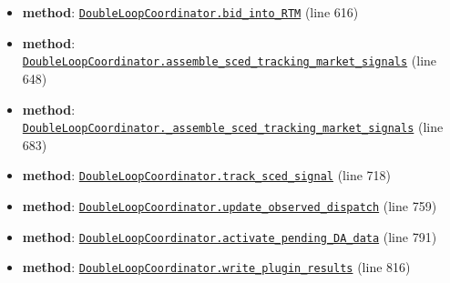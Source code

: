 \documentclass[11pt]{report}
\begin{document}
\begin{itemize}[leftmargin=*]
  \item \textbf{method}: \hyperref[def:coordinator.py:DoubleLoopCoordinator.bid_into_RTM:L616]{\texttt{DoubleLoopCoordinator.bid\_into\_RTM}} (line 616)
  \item \textbf{method}: \hyperref[def:coordinator.py:DoubleLoopCoordinator.assemble_sced_tracking_market_signals:L648]{\texttt{DoubleLoopCoordinator.assemble\_sced\_tracking\_market\_signals}} (line 648)
  \item \textbf{method}: \hyperref[def:coordinator.py:DoubleLoopCoordinator._assemble_sced_tracking_market_signals:L683]{\texttt{DoubleLoopCoordinator.\_assemble\_sced\_tracking\_market\_signals}} (line 683)
  \item \textbf{method}: \hyperref[def:coordinator.py:DoubleLoopCoordinator.track_sced_signal:L718]{\texttt{DoubleLoopCoordinator.track\_sced\_signal}} (line 718)
  \item \textbf{method}: \hyperref[def:coordinator.py:DoubleLoopCoordinator.update_observed_dispatch:L759]{\texttt{DoubleLoopCoordinator.update\_observed\_dispatch}} (line 759)
  \item \textbf{method}: \hyperref[def:coordinator.py:DoubleLoopCoordinator.activate_pending_DA_data:L791]{\texttt{DoubleLoopCoordinator.activate\_pending\_DA\_data}} (line 791)
  \item \textbf{method}: \hyperref[def:coordinator.py:DoubleLoopCoordinator.write_plugin_results:L816]{\texttt{DoubleLoopCoordinator.write\_plugin\_results}} (line 816)
\end{itemize}
\end{document}
